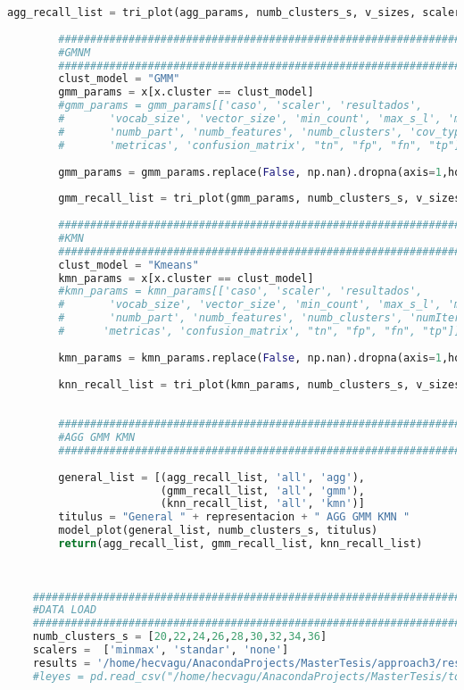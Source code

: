 \documentclass[12pt]{article}
\begin{document}
\begin{lstlisting}[language=Python, caption = Rutina de Visualización]
	    agg_recall_list = tri_plot(agg_params, numb_clusters_s, v_sizes, scalers, representacion, clust_model)
	    
	    #############################################################################
	    #GMNM
	    #############################################################################
	    clust_model = "GMM"
	    gmm_params = x[x.cluster == clust_model]
	    #gmm_params = gmm_params[['caso', 'scaler', 'resultados',
	    #       'vocab_size', 'vector_size', 'min_count', 'max_s_l', 'max_iter',
	    #       'numb_part', 'numb_features', 'numb_clusters', 'cov_type',
	    #       'metricas', 'confusion_matrix', "tn", "fp", "fn", "tp"]]
	     
	    gmm_params = gmm_params.replace(False, np.nan).dropna(axis=1,how="all")
	    
	    gmm_recall_list = tri_plot(gmm_params, numb_clusters_s, v_sizes, scalers, representacion, clust_model)
	    
	    #############################################################################
	    #KMN
	    #############################################################################
	    clust_model = "Kmeans"
	    kmn_params = x[x.cluster == clust_model]
	    #kmn_params = kmn_params[['caso', 'scaler', 'resultados',
	    #       'vocab_size', 'vector_size', 'min_count', 'max_s_l', 'max_iter',
	    #       'numb_part', 'numb_features', 'numb_clusters', 'numIterations', 
	    #      'metricas', 'confusion_matrix', "tn", "fp", "fn", "tp"]]
	     
	    kmn_params = kmn_params.replace(False, np.nan).dropna(axis=1,how="all")
	    
	    knn_recall_list = tri_plot(kmn_params, numb_clusters_s, v_sizes, scalers, representacion, clust_model)
	    
	    
	    #############################################################################
	    #AGG GMM KMN
	    #############################################################################
	    
	    general_list = [(agg_recall_list, 'all', 'agg'),
	                    (gmm_recall_list, 'all', 'gmm'),
	                    (knn_recall_list, 'all', 'kmn')]
	    titulus = "General " + representacion + " AGG GMM KMN "
	    model_plot(general_list, numb_clusters_s, titulus)
	    return(agg_recall_list, gmm_recall_list, knn_recall_list)
	
	
	    
	#############################################################################
	#DATA LOAD
	#############################################################################
	numb_clusters_s = [20,22,24,26,28,30,32,34,36]
	scalers =  ['minmax', 'standar', 'none']
	results = '/home/hecvagu/AnacondaProjects/MasterTesis/approach3/results/'
	#leyes = pd.read_csv("/home/hecvagu/AnacondaProjects/MasterTesis/todasLasLeyes.csv")
	    

\end{lstlisting}
\end{document}
